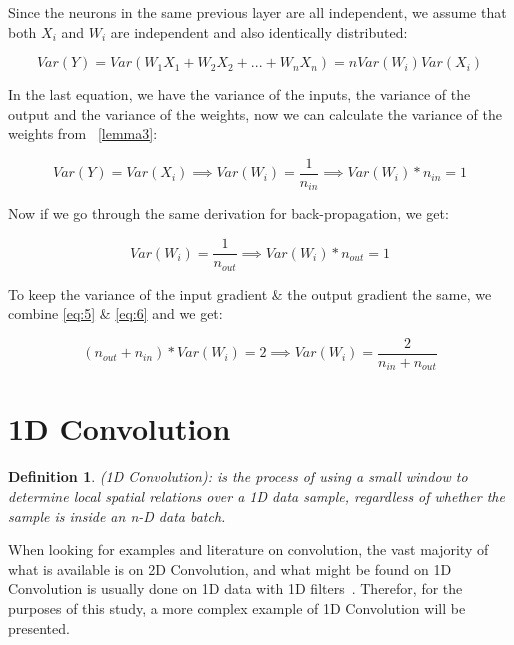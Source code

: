 \documentclass[a4paper, 12pt]{report}
\newtheorem{definition}{Definition}
\begin{document}
Since the neurons in the same previous layer are all independent, we assume that both $ X_i $ and $ W_i $  are independent and also identically distributed:
\begin{center}
	\begin{equation}
	 Var(Y) = Var(W_1X_1 + W_2X_2 + ... + W_n X_n) = nVar(W_i)Var(X_i) \label{eq:4}
	\end{equation}
\end{center}
In the last equation, we have the variance of the inputs, the variance of the output and the variance of the weights, now we can calculate the variance of the weights from ~\cref{lemma3}:
\begin{center}
	\begin{equation}
	 Var(Y) = Var(X_i) \implies Var(W_i) = \frac{1}{n_{in}} \implies Var(W_i) * n_{in} = 1  \label{eq:5}
	\end{equation}
\end{center}
Now if we go through the same derivation for back-propagation, we get:
\begin{center}
	\begin{equation}
	Var(W_i) = \frac{1}{n_{out}} \implies Var(W_i) * n_{out} = 1 \label{eq:6}
	\end{equation}
\end{center}
To keep the variance of the input gradient \& the output gradient the same, we combine
\eqref{eq:5} \& \eqref{eq:6} and we get:
\begin{center}
	\begin{equation}
	(n_{out} + n_{in}) * Var(W_i) = 2 \implies Var(W_i) = \frac{2}{n_{in} + n_{out}} \label{eq:7}
	\end{equation}
\end{center}
\newpage
\section{\textbf{1D Convolution}}\label{Conv1D}
\begin{definition}
	(1D Convolution): is the process of using a small window to determine local spatial relations over a 1D data sample, regardless of whether the sample is inside an n-D data batch.
\end{definition}
When looking for examples and literature on convolution, the vast majority of what is available is on 2D Convolution, and what might be found on 1D Convolution is usually done on 1D data with 1D filters~\citep{math-behind-1d-convolution-with-advanced-examples-in-tf}.
Therefor, for the purposes of this study, a more complex example of 1D Convolution will be presented.\\\\
\end{document}
